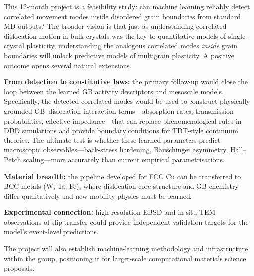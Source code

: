 \documentclass[11pt]{article}
\begin{document}
This 12-month project is a feasibility study: can machine learning reliably detect correlated movement modes inside disordered grain boundaries from standard MD outputs?
The broader vision is that just as understanding correlated dislocation motion in bulk crystals was the key to quantitative models of single-crystal plasticity, understanding the analogous correlated modes \emph{inside} grain boundaries will unlock predictive models of multigrain plasticity.
A positive outcome opens several natural extensions.

\textbf{From detection to constitutive laws:} the primary follow-up would close the loop between the learned GB activity descriptors and mesoscale models.
Specifically, the detected correlated modes would be used to construct physically grounded GB--dislocation interaction terms---absorption rates, transmission probabilities, effective impedance---that can replace phenomenological rules in DDD simulations and provide boundary conditions for TDT-style continuum theories.
The ultimate test is whether these learned parameters predict macroscopic observables---back-stress hardening, Bauschinger asymmetry, Hall--Petch scaling---more accurately than current empirical parametrisations.

\textbf{Material breadth:} the pipeline developed for FCC Cu can be transferred to BCC metals (W, Ta, Fe), where dislocation core structure and GB chemistry differ qualitatively and new mobility physics must be learned.

\textbf{Experimental connection:} high-resolution EBSD and in-situ TEM observations of slip transfer could provide independent validation targets for the model's event-level predictions.

The project will also establish machine-learning methodology and infrastructure within the group, positioning it for larger-scale computational materials science proposals.


{\footnotesize


}
\end{document}
